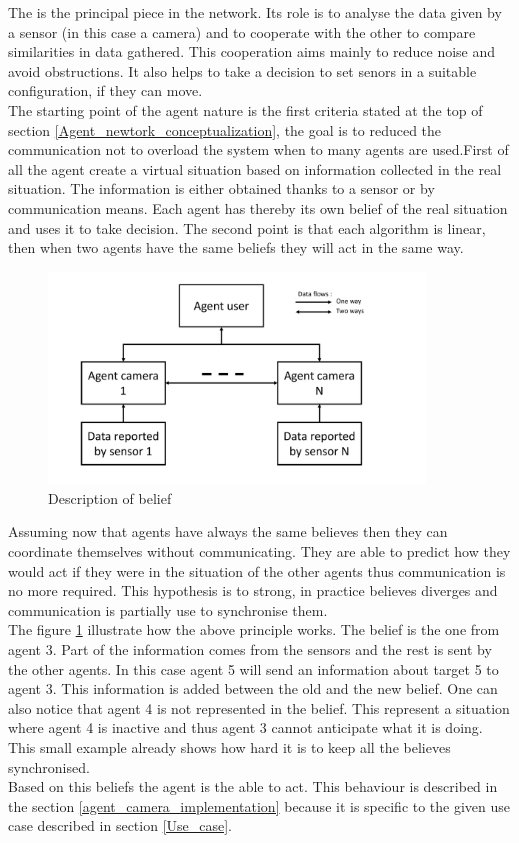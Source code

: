 The  is the principal piece in the network. Its role is to analyse the data given by a sensor (in this case a camera) and to cooperate with the other  to compare similarities in data gathered. This cooperation aims mainly to reduce noise and avoid obstructions. It also helps to take a decision to set senors in a suitable configuration, if they can move.\\

The starting point of the agent nature is the first criteria stated at the top of section \ref{Agent_newtork_conceptualization}, the goal is to reduced the communication not to overload the system when to many agents are used.First of all the agent create a virtual situation based on information collected in the real situation. The information is either obtained thanks to a sensor or by communication means. Each agent has thereby its own belief of the real situation and uses it to take decision. The second point is that each algorithm is linear, then when two agents have the same beliefs they will act in the same way.\\

\begin{figure}
    \centering
    \includegraphics[page=2,clip,width = 10cm]{systeme_multi_agent/conceptualization/multi_agent_schematic.pdf}
    \caption{Description of belief}
    \label{fig:Belief_description}
\end{figure}

Assuming now that agents have always the same believes  then they can coordinate themselves without communicating. They are able to predict how they would act if they were in the situation of the other agents thus communication is no more required. This  hypothesis is to strong, in practice believes diverges and communication is partially use to synchronise them.\\


The figure \ref{fig:Belief_description} illustrate how the above principle works. The belief is the one from agent 3. Part of the information comes from the sensors and the rest is sent by the other agents. In this case agent 5 will send an information about target 5 to agent 3. This information is added between the old and the new belief. One can also notice that agent 4 is not represented in the belief. This represent a situation where agent 4 is inactive and thus agent 3 cannot anticipate what it is doing. This small example already shows how hard it is to keep all the believes synchronised.\\

Based on this beliefs the agent is the able to act. This behaviour is described in the section \ref{agent_camera_implementation} because it is specific to the given use case described in section \ref{Use_case}.




